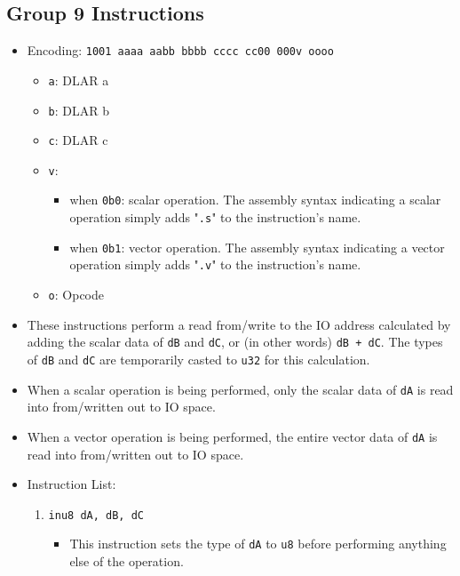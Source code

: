 \documentclass{article}
\begin{document}
	\subsection{Group 9 Instructions}
		\begin{itemize}
		\item Encoding:  \texttt{1001 aaaa aabb bbbb  cccc cc00 000v oooo}
			\begin{itemize}
			\item \texttt{a}:  DLAR a
			\item \texttt{b}:  DLAR b
			\item \texttt{c}:  DLAR c
			\item \texttt{v}:
				\begin{itemize}
				\item when \texttt{0b0}:  scalar operation.  The assembly
				syntax indicating a scalar operation simply adds
				"\texttt{.s}" to the instruction's name.
				\item when \texttt{0b1}:  vector operation.  The assembly
				syntax indicating a vector operation simply adds
				"\texttt{.v}" to the instruction's name.
				\end{itemize}
			\item \texttt{o}:  Opcode
			\end{itemize}

		\item These instructions perform a read from/write to the IO
		address calculated by adding the scalar data of \texttt{dB} and
		\texttt{dC}, or (in other words) \texttt{dB + dC}.  The types of
		\texttt{dB} and \texttt{dC} are temporarily casted to \texttt{u32}
		for this calculation.

		\item When a scalar operation is being performed, only the
		scalar data of \texttt{dA} is read into from/written out to IO
		space.

		\item When a vector operation is being performed, the
		entire vector data of \texttt{dA} is read into from/written out to
		IO space.

		\item Instruction List:
			\begin{enumerate}
			\item \texttt{inu8 dA, dB, dC}
				\begin{itemize}
				\item This instruction sets the type of \texttt{dA} to
				\texttt{u8} before performing anything else of the
				operation.


\end{itemize}
\end{enumerate}
\end{itemize}
\end{document}
